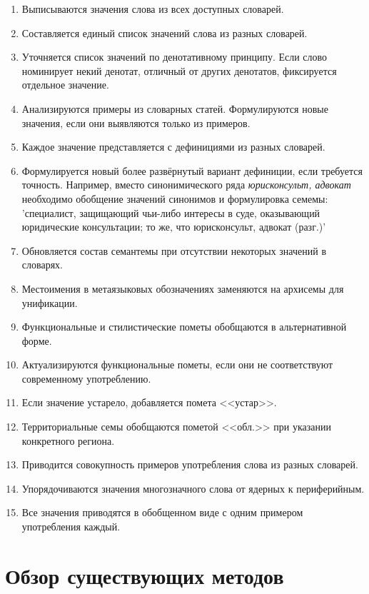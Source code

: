 \documentclass[LI,VKR]{HSEUniversity}
\begin{document}
\begin{enumerate}
    \item Выписываются значения слова из всех доступных словарей.
    \item Составляется единый список значений слова из разных словарей.
    \item Уточняется список значений по денотативному принципу.
Если слово номинирует
некий денотат, отличный от других денотатов, фиксируется отдельное
значение.
    \item Анализируются примеры из словарных статей.
Формулируются новые значения, если они выявляются только из примеров.
    \item Каждое значение представляется с дефинициями из разных словарей.
    \item Формулируется новый более развёрнутый вариант дефиниции, если требуется точность.
Например, вместо синонимического ряда \textit{юрисконсульт, адвокат}
необходимо обобщение значений синонимов и формулировка семемы:
’специалист, защищающий чьи-либо интересы в суде, оказывающий
юридические консультации; то же, что юрисконсульт, адвокат (разг.)’
    \item Обновляется состав семантемы при отсутствии некоторых значений в словарях.
    \item Местоимения в метаязыковых обозначениях заменяются на архисемы для унификации.
    \item Функциональные и стилистические пометы обобщаются в альтернативной форме.
    \item Актуализируются функциональные пометы, если они не соответствуют современному употреблению.
    \item Если значение устарело, добавляется помета <<устар>>.
    \item Территориальные семы обобщаются пометой <<обл.>> при указании конкретного региона.
    \item Приводится совокупность примеров употребления слова из разных словарей.
    \item Упорядочиваются значения многозначного слова от ядерных к периферийным.
    \item Все значения приводятся в обобщенном виде с одним примером употребления каждый.
\end{enumerate}

\section{Обзор существующих методов}
\end{document}
